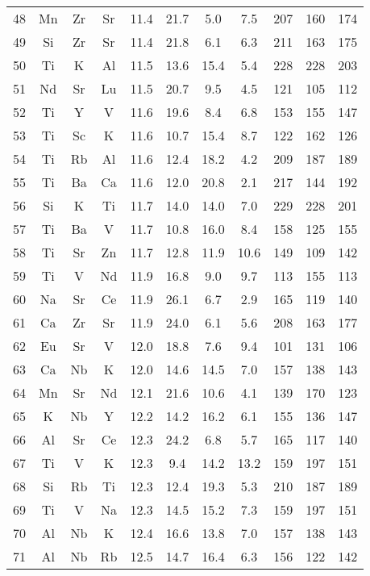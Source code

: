 \begin{center}
\begin{xtabular}{c|ccc|cccc|ccc}
 48 &  Mn &  Zr &  Sr &  11.4 &  21.7 & 5.0 & 7.5 & 207 & 160 & 174 \\
 49 &  Si &  Zr &  Sr &  11.4 &  21.8 & 6.1 & 6.3 & 211 & 163 & 175 \\
 50 &  Ti &   K &  Al &  11.5 &  13.6 &  15.4 & 5.4 & 228 & 228 & 203 \\
 51 &  Nd &  Sr &  Lu &  11.5 &  20.7 & 9.5 & 4.5 & 121 & 105 & 112 \\
 52 &  Ti &   Y &   V &  11.6 &  19.6 & 8.4 & 6.8 & 153 & 155 & 147 \\
 53 &  Ti &  Sc &   K &  11.6 &  10.7 &  15.4 & 8.7 & 122 & 162 & 126 \\
 54 &  Ti &  Rb &  Al &  11.6 &  12.4 &  18.2 & 4.2 & 209 & 187 & 189 \\
 55 &  Ti &  Ba &  Ca &  11.6 &  12.0 &  20.8 & 2.1 & 217 & 144 & 192 \\
 56 &  Si &   K &  Ti &  11.7 &  14.0 &  14.0 & 7.0 & 229 & 228 & 201 \\
 57 &  Ti &  Ba &   V &  11.7 &  10.8 &  16.0 & 8.4 & 158 & 125 & 155 \\
 58 &  Ti &  Sr &  Zn &  11.7 &  12.8 &  11.9 &  10.6 & 149 & 109 & 142 \\
 59 &  Ti &   V &  Nd &  11.9 &  16.8 & 9.0 & 9.7 & 113 & 155 & 113 \\
 60 &  Na &  Sr &  Ce &  11.9 &  26.1 & 6.7 & 2.9 & 165 & 119 & 140 \\
 61 &  Ca &  Zr &  Sr &  11.9 &  24.0 & 6.1 & 5.6 & 208 & 163 & 177 \\
 62 &  Eu &  Sr &   V &  12.0 &  18.8 & 7.6 & 9.4 & 101 & 131 & 106 \\
 63 &  Ca &  Nb &   K &  12.0 &  14.6 &  14.5 & 7.0 & 157 & 138 & 143 \\
 64 &  Mn &  Sr &  Nd &  12.1 &  21.6 &  10.6 & 4.1 & 139 & 170 & 123 \\
 65 &   K &  Nb &   Y &  12.2 &  14.2 &  16.2 & 6.1 & 155 & 136 & 147 \\
 66 &  Al &  Sr &  Ce &  12.3 &  24.2 & 6.8 & 5.7 & 165 & 117 & 140 \\
 67 &  Ti &   V &   K &  12.3 & 9.4 &  14.2 &  13.2 & 159 & 197 & 151 \\
 68 &  Si &  Rb &  Ti &  12.3 &  12.4 &  19.3 & 5.3 & 210 & 187 & 189 \\
 69 &  Ti &   V &  Na &  12.3 &  14.5 &  15.2 & 7.3 & 159 & 197 & 151 \\
 70 &  Al &  Nb &   K &  12.4 &  16.6 &  13.8 & 7.0 & 157 & 138 & 143 \\
 71 &  Al &  Nb &  Rb &  12.5 &  14.7 &  16.4 & 6.3 & 156 & 122 & 142 \\

\end{xtabular}
\end{center}
